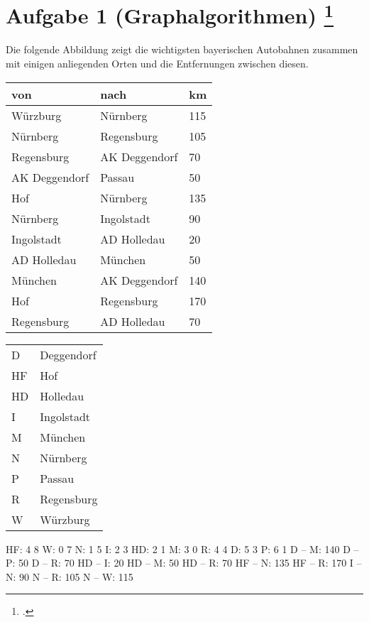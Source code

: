 \documentclass{bschlangaul-aufgabe}
\begin{document}
\def\p{ $\rightarrow$ }

\section{Aufgabe 1 (Graphalgorithmen)
\footcite{examen:66115:2017:03}}

Die folgende Abbildung zeigt die wichtigsten bayerischen Autobahnen
zusammen mit einigen anliegenden Orten und die Entfernungen zwischen
diesen.


\begin{tabular}{l|l|l}
von           & nach          & km\\\hline\hline
Würzburg      & Nürnberg      & 115\\
Nürnberg      & Regensburg    & 105\\
Regensburg    & AK Deggendorf & 70\\
AK Deggendorf & Passau        & 50\\\hline
Hof           & Nürnberg      & 135\\
Nürnberg      & Ingolstadt    & 90\\
Ingolstadt    & AD Holledau   & 20\\
AD Holledau   & München       & 50\\\hline
München       & AK Deggendorf & 140\\\hline
Hof           & Regensburg    & 170\\
Regensburg    & AD Holledau   & 70\\
\end{tabular}


\begin{tabular}{ll}
D  & Deggendorf\\
HF & Hof\\
HD & Holledau\\
I  & Ingolstadt\\
M  & München\\
N  & Nürnberg\\
P  & Passau\\
R  & Regensburg\\
W  & Würzburg\\
\end{tabular}

\begin{liGraphenFormat}
HF: 4 8
W: 0 7
N: 1 5
I: 2 3
HD: 2 1
M: 3 0
R: 4 4
D: 5 3
P: 6 1
D -- M: 140
D -- P: 50
D -- R: 70
HD -- I: 20
HD -- M: 50
HD -- R: 70
HF -- N: 135
HF -- R: 170
I -- N: 90
N -- R: 105
N -- W: 115
\end{liGraphenFormat}
\end{document}
